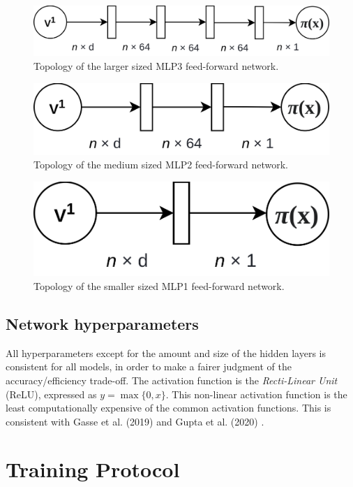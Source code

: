 \begin{figure}
    \centering
    \includegraphics[width=0.8\linewidth]{img/mlp3.png}
    \caption{Topology of the larger sized MLP3 feed-forward network.}
    \label{fig:topo_mlp3}
\end{figure}

\begin{figure}
    \centering
    \includegraphics[width=0.55\linewidth]{img/mlp2.png}
    \caption{Topology of the medium sized MLP2 feed-forward network.}
    \label{fig:topo_mlp2}
\end{figure}

\begin{figure}
    \centering
    \includegraphics[width=0.45\linewidth]{img/mlp1.png}
    \caption{Topology of the smaller sized MLP1 feed-forward network.}
    \label{fig:topo_mlp1}
\end{figure}



\subsection{Network hyperparameters}

All hyperparameters except for the amount and size of the hidden layers is consistent for all models, in order to make a fairer judgment of the accuracy/efficiency trade-off. The activation function is the \textit{Recti-Linear Unit} (ReLU), expressed as $y = \max \{ 0, x\}$. This non-linear activation function is the least computationally expensive of the common activation functions. This is consistent with Gasse et al. (2019) \cite{gasse2019exact} and Gupta et al. (2020) \cite{gupta2020hybrid}.


\section{Training Protocol}\label{sec:trainingprotocol}

